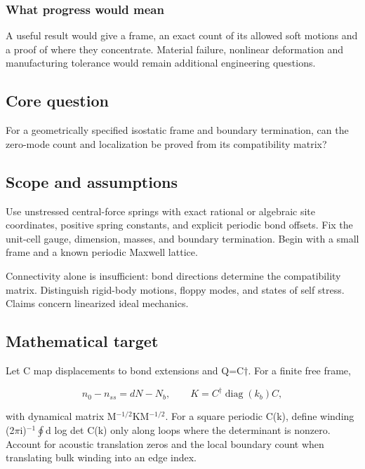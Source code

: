 \documentclass[
  11pt,
]{article}
\begin{document}
\subsubsection{What progress would mean}

A useful result would give a frame, an exact count of its allowed soft
motions and a proof of where they concentrate. Material failure,
nonlinear deformation and manufacturing tolerance would remain
additional engineering questions.

\subsection{Core question}

For a geometrically specified isostatic frame and boundary termination,
can the zero-mode count and localization be proved from its
compatibility matrix?

\subsection{Scope and assumptions}

Use unstressed central-force springs with exact rational or algebraic
site coordinates, positive spring constants, and explicit periodic bond
offsets. Fix the unit-cell gauge, dimension, masses, and boundary
termination. Begin with a small frame and a known periodic Maxwell
lattice.

Connectivity alone is insufficient: bond directions determine the
compatibility matrix. Distinguish rigid-body motions, floppy modes, and
states of self stress. Claims concern linearized ideal mechanics.

\subsection{Mathematical target}

Let C map displacements to bond extensions and Q=C\ensuremath{\dagger}.
For a finite free frame,

\[n_0- n_{ss}=dN- N_b,\qquad K=C^{\dagger }\operatorname{diag}(k_b)C,\]

with dynamical matrix M\ensuremath{{}^{-1/2}}KM\ensuremath{{}^{-1/2}}.
For a square periodic C(k), define winding
(2\ensuremath{\pi}i)\ensuremath{{}^{-1}}\ensuremath{\oint}d log det C(k)
only along loops where the determinant is nonzero. Account for acoustic
translation zeros and the local boundary count when translating bulk
winding into an edge index.
\end{document}
